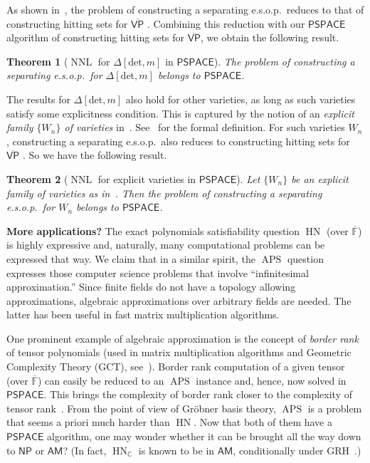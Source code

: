 \documentclass[11pt]{article}
\numberwithin{equation}{section}
\newtheorem{theorem}{Theorem}[section]
\theoremstyle{definition}
\theoremstyle{plain}
\newcommand{\cclass}[1]{\textsf{#1}}
\newcommand{\F}{\mathbb{F}}
\newcommand{\ol}[1]{\overline{#1}}
\newcommand{\NP}{\cclass{NP}\xspace}  %
\newcommand{\AM}{\cclass{AM}\xspace}  %
\newcommand{\PSPACE}{\cclass{PSPACE}\xspace}  %
\newcommand{\VP}{\cclass{VP}\xspace}  %
\newcommand{\VPbar}{\overline{\VP}\xspace}  %
\DeclareMathOperator{\APS}{\mathrm{APS}\xspace} %
\DeclareMathOperator{\HN}{\mathrm{HN}\xspace} %
\DeclareMathOperator{\NNL}{\mathrm{NNL}\xspace} %
\begin{document}
As shown in~\cite{mulmuley2017geometric}, the problem of constructing a
separating e.s.o.p.\ reduces to that of constructing hitting sets for 
%
$\VPbar$ %
\cite[Theorem~4.5]{mulmuley2017geometric}. Combining this reduction with our $\PSPACE$ algorithm of constructing hitting sets for 
%
$\VPbar$, %
we obtain the following result.
\begin{theorem}[{$\NNL$ for $\Delta[\mathrm{det}, m]$ in $\PSPACE$}] 
The problem of constructing a separating e.s.o.p.\  for $\Delta[\mathrm{det}, m]$ belongs to $\PSPACE$.
\end{theorem}

The results for $\Delta[\mathrm{det}, m]$ also hold for other  varieties, as long as such varieties satisfy some explicitness condition. This is captured by the notion of an \emph{explicit family $\{W_n\}$ of varieties} in~\cite{mulmuley2017geometric}. See~\cite[Definition~5.1]{mulmuley2017geometric} for the formal definition. For such varieties $W_n$, constructing a separating e.s.o.p.\ also reduces to constructing hitting sets for 
%
$\VPbar$ %
\cite[Theorem~5.11]{mulmuley2017geometric}.
%
So we have the following result.
\begin{theorem}[{$\NNL$ for explicit varieties in $\PSPACE$}] 
Let $\{W_n\}$ be an explicit family of  varieties as in~\cite[Definition~5.1]{mulmuley2017geometric}.
Then the problem of constructing a separating e.s.o.p.\  for $W_n$  belongs to $\PSPACE$.
\end{theorem}

%

\smallskip
\noindent
\textbf{More applications?} The exact polynomials satisfiability question 
%
$\HN$ %
(over $\ol{\F}$) is highly expressive and, naturally,
%
many computational problems
%
%
%
%
can be  %
expressed that way. We claim that in a similar spirit, the $\APS$ question expresses those computer science problems
%
that involve ``infinitesimal approximation.''
%
%
%
%
Since finite fields do not have a topology  %
allowing approximations, algebraic approximations over arbitrary fields
%
are   %
needed. The latter has been useful in fast matrix multiplication algorithms. 


One prominent example of algebraic approximation is the concept of \emph{border rank} of tensor polynomials (used in matrix multiplication algorithms and
%
Geometric Complexity Theory (GCT),  %
see~\cite{burgisser2013algebraic, landsberg2012tensors, le2014powers}). Border rank computation of a given tensor (over $\ol{\F}$) can easily be reduced to an $\APS$ instance and, hence, now solved in $\PSPACE$. This brings the complexity of border rank closer to the complexity of tensor rank~\cite{schaefer2016complexity}. {}From the point of view of Gr\"obner basis theory, $\APS$ is a problem that seems a priori much harder than 
%
$\HN$. %
Now that both of them have a $\PSPACE$ algorithm, one may wonder whether it can be brought all the way down to
$\NP$ or $\AM$?  %
%
(In fact, $\HN_{\mathbb{C}}$  %
is known to be in $\AM$, conditionally under GRH~\cite{koiran1996hilbert}.)
\end{document}

